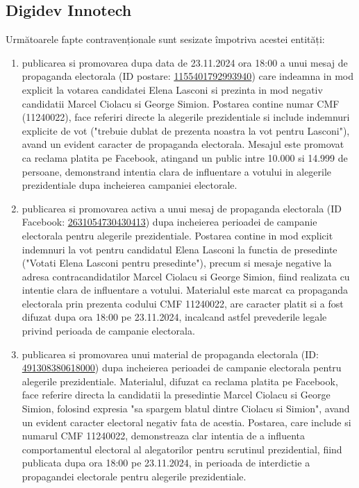 \documentclass[a4paper,12pt]{article}
\begin{document}
\vspace{0.5cm}

\subsection{Digidev Innotech}
Următoarele fapte contravenționale sunt sesizate împotriva acestei entități:

\begin{enumerate}[leftmargin=*, label=\arabic*.)]
    \item publicarea si promovarea dupa data de 23.11.2024 ora 18:00 a unui mesaj de propaganda electorala (ID postare: \href{https://www.facebook.com/ads/library/?id=1155401792993940}{1155401792993940}) care indeamna in mod explicit la votarea candidatei Elena Lasconi si prezinta in mod negativ candidatii Marcel Ciolacu si George Simion. Postarea contine numar CMF (11240022), face referiri directe la alegerile prezidentiale si include indemnuri explicite de vot ("trebuie dublat de prezenta noastra la vot pentru Lasconi"), avand un evident caracter de propaganda electorala. Mesajul este promovat ca reclama platita pe Facebook, atingand un public intre 10.000 si 14.999 de persoane, demonstrand intentia clara de influentare a votului in alegerile prezidentiale dupa incheierea campaniei electorale.
    \item publicarea si promovarea activa a unui mesaj de propaganda electorala (ID Facebook: \href{https://www.facebook.com/ads/library/?id=2631054730430413}{2631054730430413}) dupa incheierea perioadei de campanie electorala pentru alegerile prezidentiale. Postarea contine in mod explicit indemnuri la vot pentru candidatul Elena Lasconi la functia de presedinte ("Votati Elena Lasconi pentru presedinte"), precum si mesaje negative la adresa contracandidatilor Marcel Ciolacu si George Simion, fiind realizata cu intentie clara de influentare a votului. Materialul este marcat ca propaganda electorala prin prezenta codului CMF 11240022, are caracter platit si a fost difuzat dupa ora 18:00 pe 23.11.2024, incalcand astfel prevederile legale privind perioada de campanie electorala.
    \item publicarea si promovarea unui material de propaganda electorala (ID: \href{https://www.facebook.com/ads/library/?id=491308380618000}{491308380618000}) dupa incheierea perioadei de campanie electorala pentru alegerile prezidentiale. Materialul, difuzat ca reclama platita pe Facebook, face referire directa la candidatii la presedintie Marcel Ciolacu si George Simion, folosind expresia "sa spargem blatul dintre Ciolacu si Simion", avand un evident caracter electoral negativ fata de acestia. Postarea, care include si numarul CMF 11240022, demonstreaza clar intentia de a influenta comportamentul electoral al alegatorilor pentru scrutinul prezidential, fiind publicata dupa ora 18:00 pe 23.11.2024, in perioada de interdictie a propagandei electorale pentru alegerile prezidentiale.
\end{enumerate}
\end{document}

